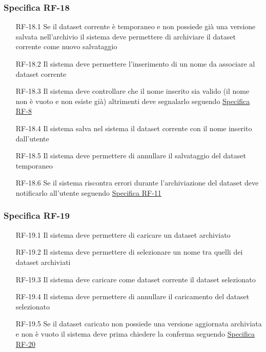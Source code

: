 \subsubsection{Specifica RF-18}
\label{subsubsec:RF-18}
\begin{enumerate}
    \item[RF-18.1] Se il dataset corrente è temporaneo e non possiede già una versione salvata nell'archivio il sistema deve permettere di archiviare il dataset corrente come nuovo salvataggio
    \item[RF-18.2] Il sistema deve permettere l'inserimento di un nome da associare al dataset corrente 
    \item[RF-18.3] Il sistema deve controllare che il nome inserito sia valido (il nome non è vuoto e non esiste già) altrimenti deve segnalarlo seguendo \hyperref[subsubsec:RF-8]{Specifica RF-8}
    \item[RF-18.4] Il sistema salva nel sistema il dataset corrente con il nome inserito dall'utente
    \item[RF-18.5] Il sistema deve permettere di annullare il salvataggio del dataset temporaneo
    \item[RF-18.6] Se il sistema riscontra errori durante l'archiviazione del dataset deve notificarlo all'utente seguendo \hyperref[subsubsec:RF-11]{Specifica RF-11}
\end{enumerate}

\subsubsection{Specifica RF-19}
\label{subsubsec:RF-19}
\begin{enumerate}
    \item[RF-19.1] Il sistema deve permettere di caricare un dataset archiviato
    \item[RF-19.2] Il sistema deve permettere di selezionare un nome tra quelli dei dataset archiviati
    \item[RF-19.3] Il sistema deve caricare come dataset corrente il dataset selezionato
    \item[RF-19.4] Il sistema deve permettere di annullare il caricamento del dataset selezionato
    \item[RF-19.5] Se il dataset caricato non possiede una versione aggiornata archiviata e non è vuoto il sistema deve prima
    chiedere la conferma seguendo \hyperref[subsubsec:RF-20]{Specifica RF-20}
\end{enumerate}

